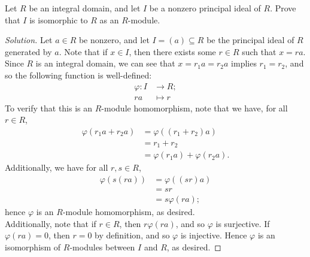 \documentclass[12pt]{article}
\newenvironment{problem}[2][Problem]{\begin{trivlist}
\item[\hskip \labelsep {\bfseries #1}\hskip \labelsep {\bfseries #2.}]}{\end{trivlist}}
\newenvironment{solution}
  {\renewcommand\qedsymbol{$\blacksquare$}\begin{proof}[Solution]}
{\end{proof}}
\theoremstyle{remark}
\begin{document}
\begin{problem}{5.13}
  Let $R$ be an integral domain, and let $I$ be a nonzero principal ideal of
  $R$. 
  Prove that $I$ is isomorphic to $R$ as an $R$-module.
\end{problem}
\begin{solution}
  Let $a\in R$ be nonzero, and let $I=(a)\subseteq R$ be the principal ideal
  of $R$ generated by $a$.
  Note that if $x\in I$, then there exists some $r\in R$ such that 
  $x=ra$.
  Since $R$ is an integral domain, we can see that $x=r_1a=r_2a$ implies
  $r_1=r_2$, and so the following function is well-defined:
  \begin{align*}
    \varphi:I&\to R;\\
    ra&\mapsto r
  \end{align*}
  To verify that this is an $R$-module homomorphism, note that we have,
  for all $r\in R$,
  \begin{align*}
    \varphi(r_1a+r_2a) &= \varphi( (r_1+r_2)a ) \\
    &= r_1+r_2\\
    &= \varphi(r_1a)+\varphi(r_2a).
  \end{align*}
  Additionally, we have for all $r,s\in R$,
  \begin{align*}
    \varphi(s(ra)) &= \varphi( (sr)a)\\
    &= sr \\
    &= s\varphi(ra);
  \end{align*}
  hence $\varphi$ is an $R$-module homomorphism, as desired.\\
  \indent Additionally, note that if $r\in R$, then $r\varphi(ra)$,
  and so $\varphi$ is surjective.
  If $\varphi(ra)=0$, then $r=0$ by definition, and so $\varphi$ is
  injective.
  Hence $\varphi$ is an isomorphism of $R$-modules between $I$ and $R$,
  as desired.
\end{solution}
\end{document}
